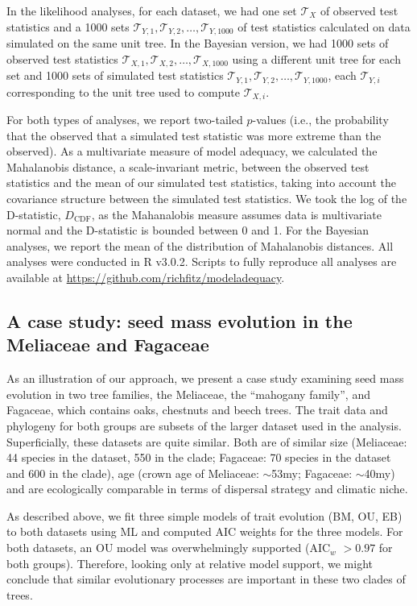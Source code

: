 In the likelihood analyses, for each dataset, we had one set $\mathcal{T}_X$ of observed test statistics and a 1000 sets $\mathcal{T}_{Y,1}, \mathcal{T}_{Y,2}, \ldots, \mathcal{T}_{Y,1000}$ of test statistics calculated on data simulated on the same unit tree. In the Bayesian version, we had 1000 sets of observed test statistics $\mathcal{T}_{X,1}, \mathcal{T}_{X,2}, \ldots, \mathcal{T}_{X,1000}$ using a different unit tree for each set and 1000 sets of simulated test statistics $\mathcal{T}_{Y,1}, \mathcal{T}_{Y,2}, \ldots, \mathcal{T}_{Y,1000}$, each $\mathcal{T}_{Y,i}$ corresponding to the unit tree used to compute $\mathcal{T}_{X,i}$.
 
For both types of analyses, we report two-tailed $p$-values (i.e., the probability that the observed that a simulated test statistic was more extreme than the observed). As a multivariate measure of model adequacy, we calculated the Mahalanobis distance, a scale-invariant metric, between the observed test statistics and the mean of our simulated test statistics, taking into account the covariance structure between the simulated test statistics. We took the log of the  D-statistic, $D_{\text{CDF}}$, as the Mahanalobis measure assumes data is multivariate normal and the D-statistic is bounded between 0 and 1. For the Bayesian analyses, we report the mean of the distribution of Mahalanobis distances. All analyses were conducted in R v3.0.2. Scripts to fully reproduce all analyses are available at \url{https://github.com/richfitz/modeladequacy}.
  
\subsection{A case study: seed mass evolution in the Meliaceae and Fagaceae }
As an illustration of our approach, we present a case study examining seed mass evolution in two tree families, the Meliaceae, the ``mahogany family'', and Fagaceae, which contains oaks, chestnuts and beech trees. The trait data and phylogeny for both groups are subsets of the larger dataset used in the analysis. Superficially, these datasets are quite similar. Both are of similar size (Meliaceae: 44 species in the dataset, 550 in the clade; Fagaceae: 70 species in the dataset and 600 in the clade), age (crown age of Meliaceae: $\sim$53my; Fagaceae: $\sim$40my) and are ecologically comparable in terms of dispersal strategy and climatic niche. 

As described above, we fit three simple models of trait evolution (BM, OU, EB) to both datasets using ML and computed AIC weights \citep[AIC$_w$;][]{Akaike1974, aicweight} for the three models. For both datasets, an OU model was overwhelmingly supported (AIC$_w$ $>0.97$ for both groups). Therefore, looking only at relative model support, we might conclude that similar evolutionary processes are important in these two clades of trees.

